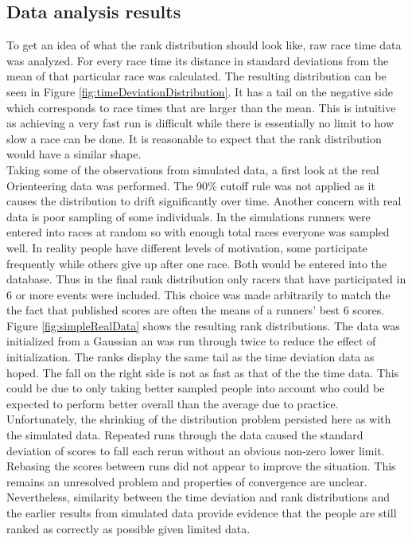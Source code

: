 \subsection{Data analysis results}
To get an idea of what the rank distribution should look like, raw race time data was analyzed. For every race time its distance in standard deviations from the mean of that particular race was calculated. The resulting distribution can be seen in Figure \ref{fig:timeDeviationDistribution}. It has a tail on the negative side which corresponds to race times that are larger than the mean. This is intuitive as achieving a very fast run is difficult while there is essentially no limit to how slow a race can be done. It is reasonable to expect that the rank distribution would have a similar shape.\\
Taking some of the observations from simulated data, a first look at the real Orienteering data was performed. The 90\% cutoff rule was not applied as it causes the distribution to drift significantly over time. Another concern with real data is poor sampling of some individuals. In the simulations runners were entered into races at random so with enough total races everyone was sampled well. In reality people have different levels of motivation, some participate frequently while others give up after one race. Both would be entered into the database. Thus in the final rank distribution only racers that have participated in 6 or more events were included. This choice was made arbitrarily to match the the fact that published scores are often the means of a runners' best 6 scores. Figure \ref{fig:simpleRealData} shows the resulting rank distributions. The data was initialized from a Gaussian an was run through twice to reduce the effect of initialization. The ranks display the same tail as the time deviation data as hoped. The fall on the right side is not as fast as that of the the time data. This could be due to only taking better sampled people into account who could be expected to perform better overall than the average due to practice.\\
Unfortunately, the shrinking of the distribution problem persisted here as with the simulated data. Repeated runs through the data caused the standard deviation of scores to fall each rerun without an obvious non-zero lower limit. Rebasing the scores between runs did not appear to improve the situation. This remains an unresolved problem and properties of convergence are unclear. Nevertheless, similarity between the time deviation and rank distributions and the earlier results from simulated data provide evidence that the people are still ranked as correctly as possible given limited data.\\
